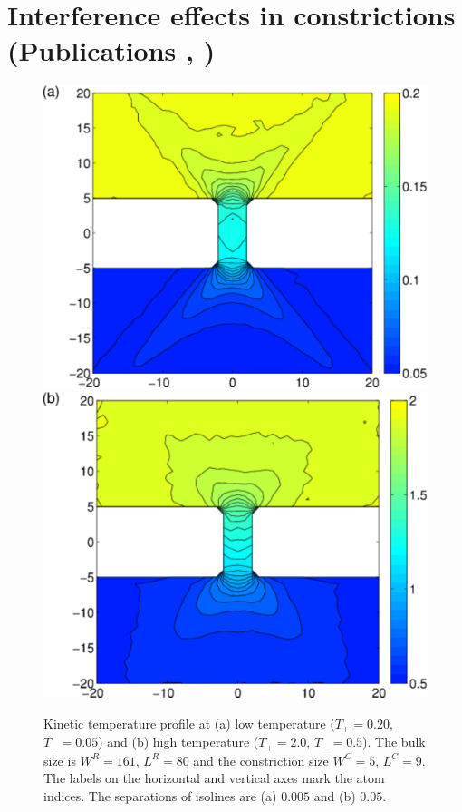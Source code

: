 \section{Interference effects in constrictions (Publications , )}

\begin{figure}
\begin{center}
 \includegraphics[width=.49\columnwidth]{pics/fpu_fig2a.pdf}
  \includegraphics[width=.49\columnwidth]{pics/fpu_fig2b.pdf}
 \caption{Kinetic temperature profile at (a) low temperature ($T_+=0.20$, $T_-=0.05$) and (b) high temperature ($T_+=2.0$, $T_-=0.5$). The bulk size is $W^R=161$, $L^R=80$ and the constriction size $W^C=5$, $L^C=9$. The labels on the horizontal and vertical axes mark the atom indices. The separations of isolines are (a) $0.005$ and (b) $0.05$.}
\label{fig:fpu_fig2}
\end{center}
\end{figure}

